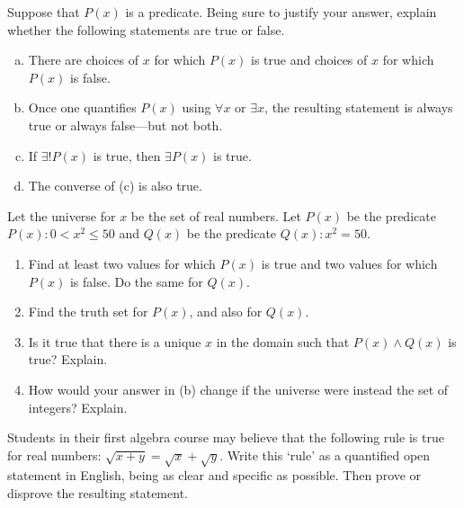 \documentclass[11pt,letterpaper]{article}
\begin{document}

 Suppose that $P(x)$ is a predicate. Being sure to justify your answer, explain whether the following statements are true or false.
	\begin{enumerate}[(a)]
	\item There are choices of $x$ for which $P(x)$ is true and choices of $x$ for which $P(x)$ is false.
	\item Once one quantifies $P(x)$ using $\forall x$ or $\exists x$, the resulting statement is always true or always false---but not both.
	\item If $\exists! P(x)$ is true, then $\exists P(x)$ is true. 
	\item The converse of (c) is also true.
	\end{enumerate}



\newpage



 Let the universe for $x$ be the set of real numbers. Let $P(x)$ be the predicate $P(x) \colon 0 < x^2 \leq 50$ and $Q(x)$ be the predicate $Q(x) \colon x^2= 50$.
	\begin{enumerate}
	\item Find at least two values for which $P(x)$ is true and two values for which $P(x)$ is false. Do the same for $Q(x)$. 
	\item Find the truth set for $P(x)$, and also for $Q(x)$.
	\item Is it true that there is a unique $x$ in the domain such that $P(x) \wedge Q(x)$ is true? Explain.
	\item How would your answer in (b) change if the universe were instead the set of integers? Explain. 
	\end{enumerate}



\newpage



 Students in their first algebra course may believe that the following rule is true for real numbers: $\sqrt{x + y}= \sqrt{x} + \sqrt{y}$. Write this `rule' as a quantified open statement in English, being as clear and specific as possible. Then prove or disprove the resulting statement.  
\end{document}
